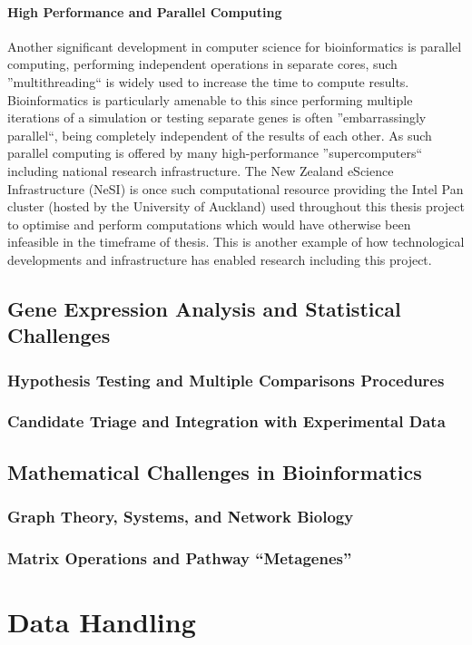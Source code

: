 \paragraph{High Performance and Parallel Computing}
Another significant development in computer science for bioinformatics is parallel computing, performing independent operations in separate cores, such ''multithreading`` is widely used to increase the time to compute results. Bioinformatics is particularly amenable to this since performing multiple iterations of a simulation or testing separate genes is often ''embarrassingly parallel``, being completely independent of the results of each other. As such parallel computing is offered by many high-performance ''supercomputers`` including national research infrastructure. The New Zealand eScience Infrastructure (NeSI) is once such computational resource providing the Intel Pan cluster (hosted by the University of Auckland) used throughout this thesis project to optimise and perform computations which would have otherwise been infeasible in the timeframe of thesis. This is another example of how technological developments and infrastructure has enabled research including this project.  

\subsection{Gene Expression Analysis and Statistical Challenges}
\subsubsection{Hypothesis Testing and Multiple Comparisons Procedures}
\subsubsection{Candidate Triage and Integration with Experimental Data}
\subsection{Mathematical Challenges in Bioinformatics}
\subsubsection{Graph Theory, Systems, and Network Biology}
\subsubsection{Matrix Operations and Pathway “Metagenes”}
\section{Data Handling}
